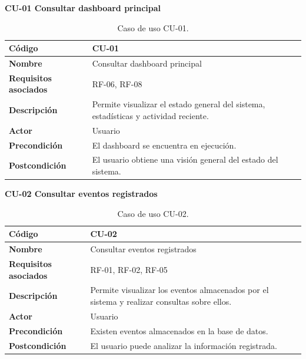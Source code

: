 \textbf{\large CU-01 Consultar dashboard principal}
\vspace{0.1cm}
\begin{table}[H]
	\centering
	\begin{tabular}{|p{4cm}|p{9cm}|}
		\hline
		\textbf{Código} & CU-01 \\
		\hline
		\textbf{Nombre} & Consultar dashboard principal \\
		\hline
		\textbf{Requisitos asociados} & RF-06, RF-08 \\
		\hline
		\textbf{Descripción} & Permite visualizar el estado general del sistema, estadísticas y actividad reciente. \\
		\hline
		\textbf{Actor} & Usuario \\
		\hline
		\textbf{Precondición} & El dashboard se encuentra en ejecución. \\
		\hline
		\textbf{Postcondición} & El usuario obtiene una visión general del estado del sistema. \\
		\hline
	\end{tabular}
	\caption{Caso de uso CU-01.}
\end{table}

\textbf{\large CU-02 Consultar eventos registrados}
\vspace{0.1cm}
\begin{table}[H]
	\centering
	\begin{tabular}{|p{4cm}|p{9cm}|}
		\hline
		\textbf{Código} & CU-02 \\
		\hline
		\textbf{Nombre} & Consultar eventos registrados \\
		\hline
		\textbf{Requisitos asociados} & RF-01, RF-02, RF-05 \\
		\hline
		\textbf{Descripción} & Permite visualizar los eventos almacenados por el sistema y realizar consultas sobre ellos. \\
		\hline
		\textbf{Actor} & Usuario \\
		\hline
		\textbf{Precondición} & Existen eventos almacenados en la base de datos. \\
		\hline
		\textbf{Postcondición} & El usuario puede analizar la información registrada. \\
		\hline
	\end{tabular}
	\caption{Caso de uso CU-02.}
\end{table}

